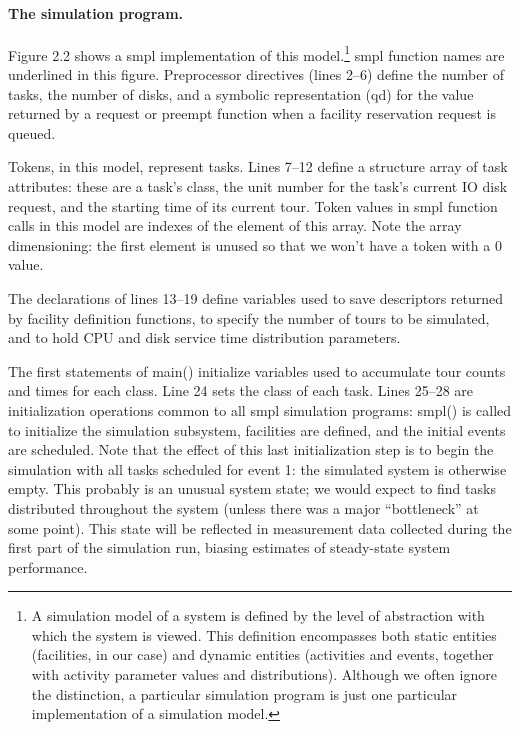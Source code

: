 \paragraph{The simulation program.}
Figure 2.2 shows a smpl implementation of this model.\footnote{A simulation
model of a system is defined by the level of abstraction with which the system
is viewed. This definition encompasses both static entities (facilities, in our
case) and dynamic entities (activities and events, together with activity
parameter values and distributions). Although we often ignore the distinction,
a particular simulation program is just one particular implementation of a
simulation model.} smpl function names are
underlined in this figure. Preprocessor directives (lines 2--6) define the
number of tasks, the number of disks, and a symbolic representation (qd) for
the value returned by a request or preempt function when a facility
reservation request is queued.

Tokens, in this model, represent tasks. Lines 7--12 define a structure array
of task attributes: these are a task's class, the unit number for the task's
current IO disk request, and the starting time of its current tour. Token
values in smpl function calls in this model are indexes of the element of this
array. Note the array dimensioning: the first element is unused so that we
won't have a token with a 0 value.

The declarations of lines 13--19 define variables used to save descriptors
returned by facility definition functions, to specify the number of tours to be
simulated, and to hold CPU and disk service time distribution parameters.

The first statements of main() initialize variables used to accumulate tour
counts and times for each class. Line 24 sets the class of each task. Lines
25--28 are initialization operations common to all smpl simulation programs:
smpl() is called to initialize the simulation subsystem, facilities are
defined, and the initial events are scheduled. Note that the effect of this
last initialization step is to begin the simulation with all tasks scheduled
for event 1: the simulated system is otherwise empty. This probably is an
unusual system state; we would expect to find tasks distributed throughout the
system (unless there was a major ``bottleneck'' at some point). This state
will be reflected in measurement data collected during the first part of the
simulation run, biasing estimates of steady-state system performance.

